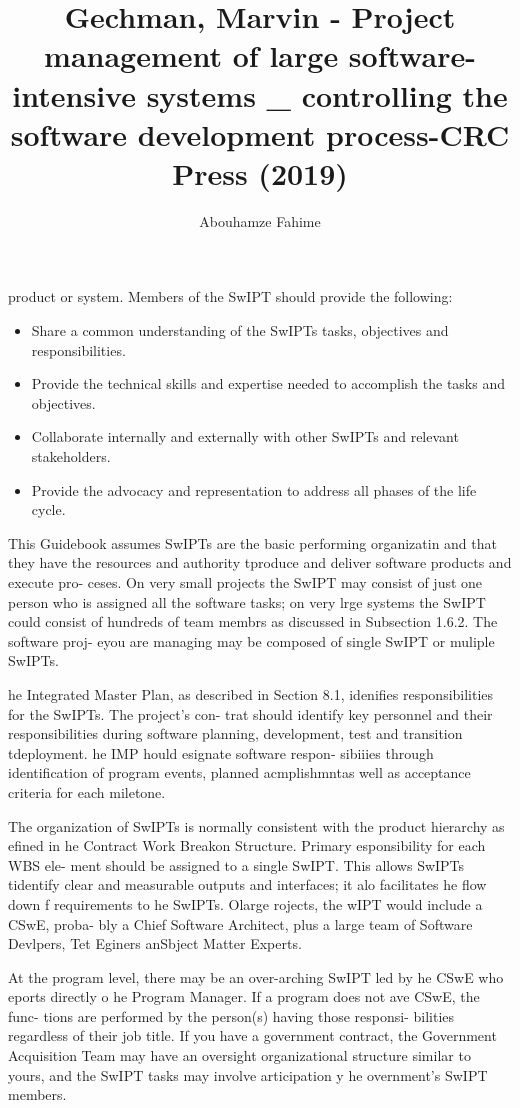 \documentclass{book}
\title{Gechman, Marvin - Project management of large software-intensive systems _ controlling the software development process-CRC Press (2019)}
\author{Abouhamze Fahime}
\begin{document}
\chapter{}
\begin{multicols}{2}
product or system. Members of the SwIPT should provide
the following:
\begin{itemize}
	\renewcommand{\labelitemi}{\scriptsize$\blacksquare$}
	\item
	Share a common understanding of the SwIPTs tasks,
	objectives and responsibilities.
	\item
	Provide the technical skills and expertise needed to
	accomplish the tasks and objectives.
	\item
	Collaborate internally and externally with other
	SwIPTs and relevant stakeholders.
	\item
	Provide the advocacy and representation to address all
	phases of the life cycle.
\end{itemize}

	This Guidebook assumes SwIPTs are the basic performing
organizatin and that they have the resources and authority
tproduce and deliver software products and execute pro-
ceses. On very small projects the SwIPT may consist of just
one person who is assigned all the software tasks; on very
lrge systems the SwIPT could consist of hundreds of team
membrs as discussed in Subsection 1.6.2. The software proj-
eyou are managing may be composed of single SwIPT or
muliple SwIPTs.

	he Integrated Master Plan, as described in Section 8.1,
idenifies responsibilities for the SwIPTs. The project’s con-
trat should identify key personnel and their responsibilities
during software planning, development, test and transition
tdeployment. he IMP hould esignate software respon-
sibiiies through identification of program events, planned
acmplishmntas well as acceptance criteria for each
miletone.

	The organization of SwIPTs is normally consistent with
the product hierarchy as efined in he Contract Work
Breakon Structure. Primary esponsibility for each WBS ele-
ment should be assigned to a single SwIPT. This allows SwIPTs
tidentify clear and measurable outputs and interfaces; it
alo facilitates he flow down f requirements to he SwIPTs.
Olarge rojects, the wIPT would include a CSwE, proba-
bly a Chief Software Architect, plus a large team of Software
Devlpers, Tet Eginers anSbject Matter Experts.

	At the program level, there may be an over-arching
SwIPT led by he CSwE who eports directly o he Program
Manager. If a program does not ave CSwE, the func-
tions are performed by the person(s) having those responsi-
bilities regardless of their job title. If you have a government
contract, the Government Acquisition Team may have an
oversight organizational structure similar to yours, and the
SwIPT tasks may involve articipation y he overnment’s
SwIPT members.\\


\end{multicols}
\end{document}
